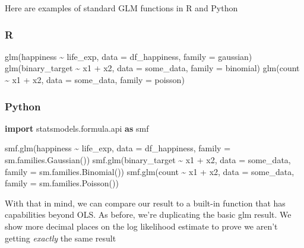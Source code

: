 \documentclass[
  letterpaper,
]{krantz}
\newenvironment{Shaded}{}{}
\newcommand{\AttributeTok}[1]{\textcolor[rgb]{0.49,0.56,0.16}{#1}}
\newcommand{\FunctionTok}[1]{\textcolor[rgb]{0.02,0.16,0.49}{#1}}
\newcommand{\ImportTok}[1]{\textcolor[rgb]{0.00,0.50,0.00}{\textbf{#1}}}
\newcommand{\NormalTok}[1]{#1}
\newcommand{\OperatorTok}[1]{\textcolor[rgb]{0.40,0.40,0.40}{#1}}
\newcommand{\SpecialCharTok}[1]{\textcolor[rgb]{0.25,0.44,0.63}{#1}}
\newcommand{\StringTok}[1]{\textcolor[rgb]{0.25,0.44,0.63}{#1}}
\begin{document}
Here are examples of standard GLM functions in R and Python

\subsubsection{R}

\begin{Shaded}
\begin{Highlighting}[]
\FunctionTok{glm}\NormalTok{(happiness }\SpecialCharTok{\textasciitilde{}}\NormalTok{ life\_exp, }\AttributeTok{data =}\NormalTok{ df\_happiness, }\AttributeTok{family =}\NormalTok{ gaussian)}
\FunctionTok{glm}\NormalTok{(binary\_target }\SpecialCharTok{\textasciitilde{}}\NormalTok{ x1 }\SpecialCharTok{+}\NormalTok{ x2, }\AttributeTok{data =}\NormalTok{ some\_data, }\AttributeTok{family =}\NormalTok{ binomial)}
\FunctionTok{glm}\NormalTok{(count }\SpecialCharTok{\textasciitilde{}}\NormalTok{ x1 }\SpecialCharTok{+}\NormalTok{ x2, }\AttributeTok{data =}\NormalTok{ some\_data, }\AttributeTok{family =}\NormalTok{ poisson)}
\end{Highlighting}
\end{Shaded}

\subsubsection{Python}

\begin{Shaded}
\begin{Highlighting}[]
\ImportTok{import}\NormalTok{ statsmodels.formula.api }\ImportTok{as}\NormalTok{ smf}

\NormalTok{smf.glm(}\StringTok{\textquotesingle{}happiness \textasciitilde{} life\_exp\textquotesingle{}}\NormalTok{, data }\OperatorTok{=}\NormalTok{ df\_happiness, family }\OperatorTok{=}\NormalTok{ sm.families.Gaussian())}
\NormalTok{smf.glm(}\StringTok{\textquotesingle{}binary\_target \textasciitilde{} x1 + x2\textquotesingle{}}\NormalTok{, data }\OperatorTok{=}\NormalTok{ some\_data, family }\OperatorTok{=}\NormalTok{ sm.families.Binomial())}
\NormalTok{smf.glm(}\StringTok{\textquotesingle{}count \textasciitilde{} x1 + x2\textquotesingle{}}\NormalTok{, data }\OperatorTok{=}\NormalTok{ some\_data, family }\OperatorTok{=}\NormalTok{ sm.families.Poisson())}
\end{Highlighting}
\end{Shaded}

With that in mind, we can compare our result to a built-in function that
has capabilities beyond OLS. As before, we're duplicating the basic glm
result. We show more decimal places on the log likelihood estimate to
prove we aren't getting \emph{exactly} the same result
\end{document}
